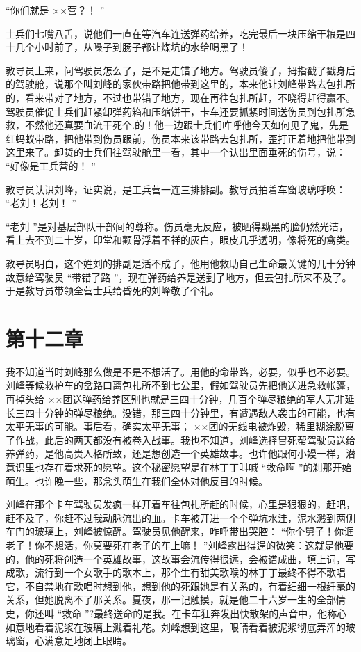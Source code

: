 \documentclass[12pt,twoside,openany]{book}
\begin{document}
“你们就是 ××营？！ ”

士兵们七嘴八舌，说他们一直在等汽车连送弹药给养，吃完最后一块压缩干粮是四十几个小时前了，从嗓子到肠子都让煤坑的水给喝黑了！

教导员上来，问驾驶员怎么了，是不是走错了地方。驾驶员傻了，拇指戳了戳身后的驾驶舱，说那个叫刘峰的家伙带路把他带到这里的，本来他让刘峰带路去包扎所的，看来带对了地方，不过也带错了地方，现在再往包扎所赶，不晓得赶得赢不。驾驶员催促士兵们赶紧卸弹药箱和压缩饼干，卡车还要抓紧时间送伤员到包扎所急救，不然他还真要血流干死个.的！他一边跟士兵们咋呼他今天如何见了鬼，先是红蚂蚁带路，把他带到伤员跟前，伤员本来该带路去包扎所，歪打正着地把他带到这里来了。卸货的士兵们往驾驶舱里一看，其中一个认出里面垂死的伤号，说： “好像是工兵营的！ ”

教导员认识刘峰，证实说，是工兵营一连三排排副。教导员拍着车窗玻璃呼唤： “老刘！老刘！ ”

“老刘 ”是对基层部队干部间的尊称。伤员毫无反应，被晒得黝黑的脸仍然光洁，看上去不到二十岁，印堂和颧骨浮着不祥的灰白，眼皮几乎透明，像将死的禽类。

教导员明白，这个姓刘的排副是活不成了，他用他救助自己生命最关键的几十分钟故意给驾驶员 “带错了路 ”，现在弹药给养是送到了地方，但去包扎所来不及了。于是教导员带领全营士兵给昏死的刘峰敬了个礼。

\chapter{第十二章}

我不知道当时刘峰那么做是不是不想活了。用他的命带路，必要，似乎也不必要。刘峰等候救护车的岔路口离包扎所不到七公里，假如驾驶员先把他送进急救帐篷，再掉头给 ××团送弹药给养区别也就是三四十分钟，几百个弹尽粮绝的军人无非延长三四十分钟的弹尽粮绝。没错，那三四十分钟里，有遭遇敌人袭击的可能，也有太平无事的可能。事后看，确实太平无事； ××团的无线电被炸毁，稀里糊涂脱离了作战，此后的两天都没有被卷入战事。我也不知道，刘峰选择冒死帮驾驶员送给养弹药，是他高贵人格所致，还是想创造一个英雄故事。也许他跟何小嫚一样，潜意识里也存在着求死的愿望。这个秘密愿望是在林丁丁叫喊 “救命啊 ”的刹那开始萌生。也许晚一些，那念头萌生在我们全体对他反目的时候。

刘峰在那个卡车驾驶员发疯一样开着车往包扎所赶的时候，心里是狠狠的，赶吧，赶不及了，你赶不过我动脉流出的血。卡车被开进一个个弹坑水洼，泥水溅到两侧车门的玻璃上，刘峰被惊醒。驾驶员见他醒来，咋呼带出哭腔： “你个舅子！你诓老子！你不想活，你莫要死在老子的车上嘛！ ”刘峰露出得逞的微笑：这就是他要的，他的死将创造一个英雄故事，这故事会流传得很远，会被谱成曲，填上词，写成歌，流行到一个女歌手的歌本上，那个生有甜美歌喉的林丁丁最终不得不歌唱它，不自禁地在歌唱时想到他，想到他的死跟她是有关系的，有着细细一根纤毫的关系，但她脱离不了那关系。夏夜，那一记触摸，就是他二十六岁一生的全部情史，你还叫 “救命 ”?最终送命的是我。在卡车狂奔发出快散架的声音中，他称心如意地看着泥浆在玻璃上溅着礼花。刘峰想到这里，眼睛看着被泥浆彻底弄浑的玻璃窗，心满意足地闭上眼睛。
\end{document}
